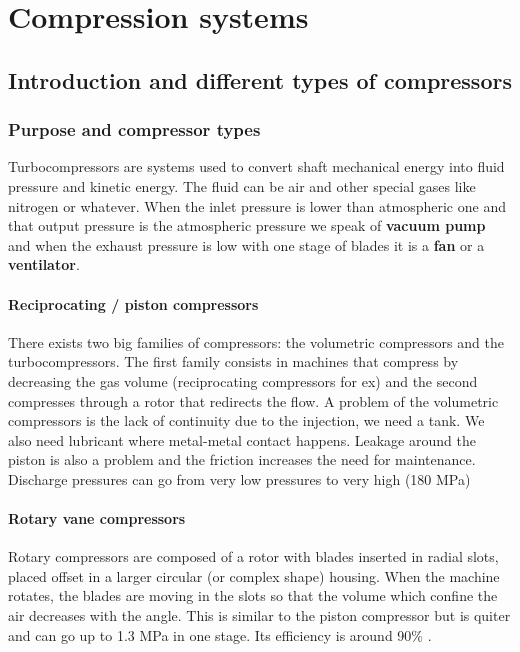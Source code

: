 
\chapter{Compression systems}
\section{Introduction and different types of compressors}
\subsection{Purpose and compressor types}
Turbocompressors are systems used to convert shaft mechanical energy into fluid pressure and kinetic energy. The fluid can be air and other special gases like nitrogen or whatever. When the inlet pressure is lower than atmospheric one and that output pressure is the atmospheric pressure we speak of \textbf{vacuum pump} and when the exhaust pressure is low with one stage of blades it is a \textbf{fan} or a \textbf{ventilator}.

\subsubsection{Reciprocating / piston compressors}
There exists two big families of compressors: the volumetric compressors and the turbocompressors. The first family consists in machines that compress by decreasing the gas volume (reciprocating compressors for ex) and the second compresses through a rotor that redirects the flow. A problem of the volumetric compressors is the lack of continuity due to the injection, we need a tank. We also need lubricant where metal-metal contact happens. Leakage around the piston is also a problem and the friction increases the need for maintenance. 
Discharge pressures can go from very low pressures to very high (180 MPa)

\subsubsection{Rotary vane compressors}
Rotary compressors are composed of a rotor with blades inserted in radial slots, placed offset in a larger circular (or complex shape) housing. When the machine rotates, the blades are moving in the slots so that the volume which confine the air decreases with the angle. This is similar to the piston compressor but is quiter and can go up to 1.3 MPa in one stage. Its efficiency is around 90\% .

